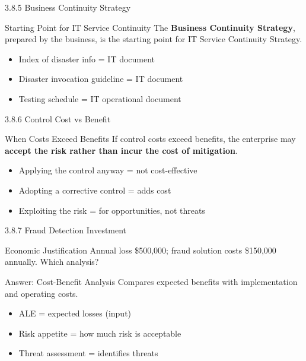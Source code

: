 \documentclass{beamer}
\begin{document}
	\begin{frame}{3.8.5 Business Continuity Strategy}
		\begin{block}{Starting Point for IT Service Continuity}
			The \textbf{Business Continuity Strategy}, prepared by the business, is the starting point for IT Service Continuity Strategy.
		\end{block}
		\begin{itemize}
			\item Index of disaster info = IT document
			\item Disaster invocation guideline = IT document
			\item Testing schedule = IT operational document
		\end{itemize}
	\end{frame}
	
	\begin{frame}{3.8.6 Control Cost vs Benefit}
		\begin{block}{When Costs Exceed Benefits}
			If control costs exceed benefits, the enterprise may \textbf{accept the risk rather than incur the cost of mitigation}.
		\end{block}
		\begin{itemize}
			\item Applying the control anyway = not cost-effective
			\item Adopting a corrective control = adds cost
			\item Exploiting the risk = for opportunities, not threats
		\end{itemize}
	\end{frame}
	
	\begin{frame}{3.8.7 Fraud Detection Investment}
		\begin{block}{Economic Justification}
			Annual loss \$500,000; fraud solution costs \$150,000 annually. Which analysis?
		\end{block}
		\begin{exampleblock}{Answer: Cost-Benefit Analysis}
			Compares expected benefits with implementation and operating costs.
		\end{exampleblock}
		\begin{itemize}
			\item ALE = expected losses (input)
			\item Risk appetite = how much risk is acceptable
			\item Threat assessment = identifies threats
		\end{itemize}
	\end{frame}
	
\end{document}
